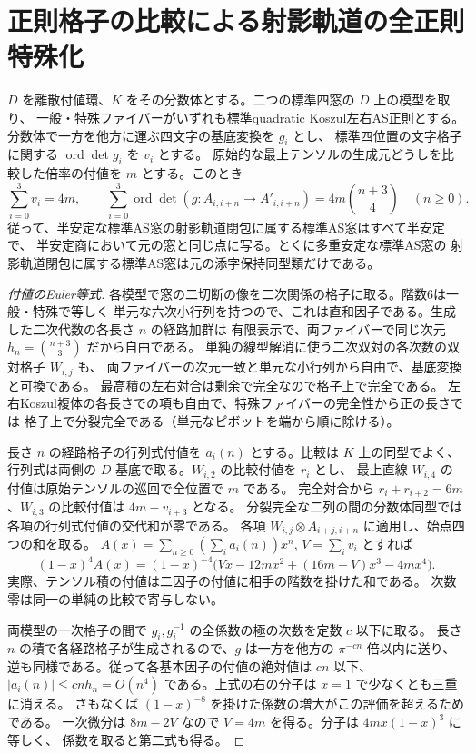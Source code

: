 \section{正則格子の比較による射影軌道の全正則特殊化}
\label{sec:regular-orbit-valuations}
\begin{theorem}\label{thm:regular-orbit-valuations}
$D$ を離散付値環、$K$ をその分数体とする。二つの標準四窓の $D$ 上の模型を取り、
一般・特殊ファイバーがいずれも標準quadratic Koszul左右AS正則とする。
分数体で一方を他方に運ぶ四文字の基底変換を $g_i$ とし、
標準四位置の文字格子に関する $\operatorname{ord}\det g_i$ を $v_i$ とする。
原始的な最上テンソルの生成元どうしを比較した倍率の付値を $m$ とする。このとき
\[
 \sum_{i=0}^3 v_i=4m,\qquad
 \sum_{i=0}^3\operatorname{ord}\det(g:A_{i,i+n}\longrightarrow A'_{i,i+n})
       =4m\binom{n+3}{4}\quad(n\ge0).
\]
従って、半安定な標準AS窓の射影軌道閉包に属する標準AS窓はすべて半安定で、
半安定商において元の窓と同じ点に写る。とくに多重安定な標準AS窓の
射影軌道閉包に属する標準AS窓は元の添字保持同型類だけである。
\end{theorem}
\begin{proof}[付値のEuler等式]
各模型で窓の二切断の像を二次関係の格子に取る。階数6は一般・特殊で等しく
単元な六次小行列を持つので、これは直和因子である。生成した二次代数の各長さ $n$ の経路加群は
有限表示で、両ファイバーで同じ次元 $h_n=\binom{n+3}3$ だから自由である。
単純の線型解消に使う二次双対の各次数の双対格子 $W_{i,j}$ も、
両ファイバーの次元一致と単元な小行列から自由で、基底変換と可換である。
最高積の左右対合は剰余で完全なので格子上で完全である。
左右Koszul複体の各長さでの項も自由で、特殊ファイバーの完全性から正の長さでは
格子上で分裂完全である（単元なピボットを端から順に除ける）。

長さ $n$ の経路格子の行列式付値を $a_i(n)$ とする。比較は $K$ 上の同型でよく、
行列式は両側の $D$ 基底で取る。$W_{i,2}$ の比較付値を $r_i$ とし、
最上直線 $W_{i,4}$ の付値は原始テンソルの巡回で全位置で $m$ である。
完全対合から $r_i+r_{i+2}=6m$、$W_{i,3}$ の比較付値は $4m-v_{i+3}$ となる。
分裂完全な二列の間の分数体同型では各項の行列式付値の交代和が零である。
各項 $W_{i,j}\otimes A_{i+j,i+n}$ に適用し、始点四つの和を取る。
$A(x)=\sum_{n\ge0}(\sum_i a_i(n))x^n$, $V=\sum_i v_i$ とすれば
\[
 (1-x)^4 A(x)=(1-x)^{-4}\big(Vx-12m x^2+(16m-V)x^3-4m x^4\big).
\]
実際、テンソル積の付値は二因子の付値に相手の階数を掛けた和である。
次数零は同一の単純の比較で寄与しない。

両模型の一次格子の間で $g_i,g_i^{-1}$ の全係数の極の次数を定数 $c$ 以下に取る。
長さ $n$ の積で各経路格子が生成されるので、$g$ は一方を他方の $\pi^{-cn}$ 倍以内に送り、
逆も同様である。従って各基本因子の付値の絶対値は $cn$ 以下、
$|a_i(n)|\le cn h_n=O(n^4)$ である。上式の右の分子は $x=1$ で少なくとも三重に消える。
さもなくば $(1-x)^{-8}$ を掛けた係数の増大がこの評価を超えるためである。
一次微分は $8m-2V$ なので $V=4m$ を得る。分子は $4mx(1-x)^3$ に等しく、
係数を取ると第二式も得る。
\end{proof}
